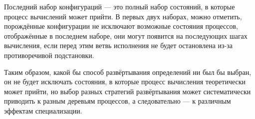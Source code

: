 Последний набор конфигураций --- это полный набор состояний, в которые процесс вычислений может
прийти. В первых двух наборах, можно отметить, порождённые конфигурации не исключают
возможные состояния процессов, отображённые в последнем наборе, они могут появится на последующих шагах вычисления,
если перед этим ветвь исполнения не будет остановлена из-за противоречивой подстановки.

Таким образом, какой бы способ развёртывания определений ни был бы выбран, он не будет
исключать состояния, в которые процесс вычисления теоретически может прийти, но выбор
разных стратегий развёртывания может систематически приводить к разным деревьям процессов,
а следовательно --- к различным эффектам специализации.

